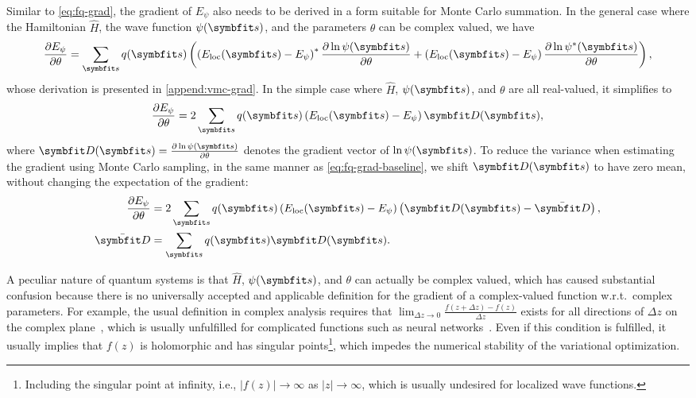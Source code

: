Similar to \cref{eq:fq-grad}, the gradient of $E_\psi$ also needs to be derived in a form suitable for Monte Carlo summation. In the general case where the Hamiltonian $\hat{H}$, the wave function $\psi(\vs)$, and the parameters $\theta$ can be complex valued, we have
\begin{equation}
\frac{\partial E_\psi}{\partial \theta} = \sum_\vs q(\vs) \left( \left( E_\text{loc}(\vs) - E_\psi \right)^* \frac{\partial \ln \psi(\vs)}{\partial \theta} + \left( E_\text{loc}(\vs) - E_\psi \right) \frac{\partial \ln \psi^*(\vs)}{\partial \theta} \right), \label{eq:vmc-grad-cmpl}
\end{equation}
whose derivation is presented in \cref{append:vmc-grad}. In the simple case where $\hat{H}$, $\psi(\vs)$, and $\theta$ are all real-valued, it simplifies to
\begin{equation}
\frac{\partial E_\psi}{\partial \theta} = 2 \sum_\vs q(\vs) \left( E_\text{loc}(\vs) - E_\psi \right) \vD(\vs),
\label{eq:vmc-grad-real}
\end{equation}
where $\vD(\vs) = \frac{\partial \ln \psi(\vs)}{\partial \theta}$ denotes the gradient vector of $\ln \psi(\vs)$. To reduce the variance when estimating the gradient using Monte Carlo sampling, in the same manner as \cref{eq:fq-grad-baseline}, we shift $\vD(\vs)$ to have zero mean, without changing the expectation of the gradient:
\begin{align}
\frac{\partial E_\psi}{\partial \theta} &= 2 \sum_\vs q(\vs) \left( E_\text{loc}(\vs) - E_\psi \right) \left( \vD(\vs) - \bar{\vD} \right), \label{eq:vmc-grad-baseline} \\
\bar{\vD} &= \sum_\vs q(\vs) \vD(\vs).
\end{align}

A peculiar nature of quantum systems is that $\hat{H}$, $\psi(\vs)$, and $\theta$ can actually be complex valued, which has caused substantial confusion because there is no universally accepted and applicable definition for the gradient of a complex-valued function w.r.t.\ complex parameters. For example, the usual definition in complex analysis requires that $\lim_{\Delta z \to 0} \frac{f(z + \Delta z) - f(z)}{\Delta z}$ exists for all directions of $\Delta z$ on the complex plane~\cite{rudin1986real}, which is usually unfulfilled for complicated functions such as neural networks~\cite{bassey2021survey}. Even if this condition is fulfilled, it usually implies that $f(z)$ is holomorphic and has singular points\footnote{Including the singular point at infinity, i.e., $|f(z)| \to \infty$ as $|z| \to \infty$, which is usually undesired for localized wave functions.}, which impedes the numerical stability of the variational optimization.

